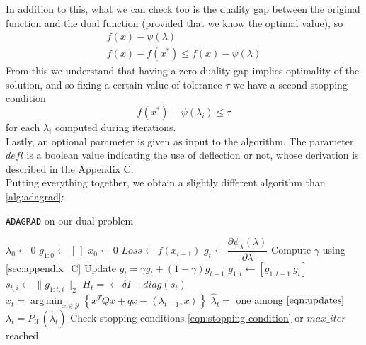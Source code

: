 \documentclass[notitlepage]{article}
\DeclareMathOperator*{\argmin}{arg\,min}
\begin{document}
In addition to this, what we can check too is the duality gap between the original function and the dual function (provided that we know the optimal value), so
\begin{gather*}
  f(x) - \psi(\lambda) \\
  f(x) - f(x^*) \le f(x) - \psi(\lambda)
\end{gather*}
From this we understand that having a zero duality gap implies optimality of the solution, and so fixing a certain value of tolerance $\tau$ we have a second stopping condition
\[
  f(x^*) - \psi(\lambda_i) \le \tau  
\] 
for each $\lambda_i$ computed during iterations.\\
Lastly, an optional parameter is given as input to the algorithm. The parameter $defl$ is a boolean value indicating the use of deflection or not, whose derivation is described in the Appendix C.\\
Putting everything together, we obtain a slightly different algorithm than \ref{alg:adagrad}:
\begin{flushleft}
  \begin{minipage}{\textwidth}
    \begin{algorithm}[H]
      \caption{\texttt{ADAGRAD} on our dual problem}
      \label{alg:my_alg}
      \begin{algorithmic}
          \State $\lambda_0 \gets 0$
          \State $g_{1:0} \gets \left[\,\right]$
          \State $x_0 \gets 0$
            \State $Loss \gets f(x_{t-1})$
            \State $g_t \gets \dfrac{\partial \psi_\lambda(\lambda)}{\partial \lambda}$
                \State Compute $\gamma$ using \ref{sec:appendix_C}
                \State Update $g_t = \gamma g_t + (1 - \gamma) g_{t-1}$
              \EndIf
            \State $g_{1:t} \gets \left[ g_{1:t-1}\ g_t \right]$
            \State $s_{t,i} \gets \| g_{1:t,i} \|_2$
            \State $H_t = \gets \delta \mathit{I} + diag(s_t)$
            \State $x_t = \argmin_{x \in \mathcal{Y}} \left\lbrace x^T Q x + q x - \left\langle \lambda_{t-1},x \right\rangle \right\rbrace$
            \State $\hat{\lambda}_t =$ one among $\eqref{eqn:updates}$
            \State $\lambda_t = P_\mathcal{X}(\hat{\lambda}_t)$ 
            \State Check stopping conditions \eqref{eqn:stopping-condition} or $max\_iter$ reached
          \EndFor
        \EndFunction
      \end{algorithmic}  
    \end{algorithm}
  \end{minipage}
\end{flushleft}
\end{document}
